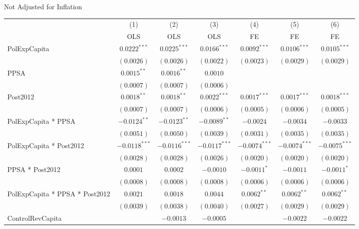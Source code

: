 \documentclass[border=10pt,varwidth=25cm]{standalone}
\renewenvironment{table}[1][]{}{}
\begin{document}
\begin{table}[H]
    \centering
    \scriptsize
    \begin{minipage}{\textwidth}
    \centering
    {\normalsize Not Adjusted for Inflation}
    \vspace{6pt}
    \begin{tabular}{lcccccc}
        \toprule
         & (1) & (2) & (3) & (4) & (5) & (6) \\
         & OLS & OLS & OLS & FE & FE & FE \\
        \midrule
        PolExpCapita & $0.0222^{***}$ & $0.0225^{***}$ & $0.0166^{***}$ & $0.0092^{***}$ & $0.0106^{***}$ & $0.0105^{***}$ \\
         & $(0.0026)$ & $(0.0026)$ & $(0.0022)$ & $(0.0023)$ & $(0.0029)$ & $(0.0029)$ \\[4pt]
        PPSA & $0.0015^{**}$ & $0.0016^{**}$ & $0.0010$ &  &  &  \\
         & $(0.0007)$ & $(0.0007)$ & $(0.0006)$ &  &  &  \\[4pt]
        Post2012 & $0.0018^{**}$ & $0.0018^{**}$ & $0.0022^{***}$ & $0.0017^{***}$ & $0.0017^{***}$ & $0.0018^{***}$ \\
         & $(0.0007)$ & $(0.0007)$ & $(0.0006)$ & $(0.0005)$ & $(0.0006)$ & $(0.0005)$ \\[4pt]
        PolExpCapita * PPSA & $-0.0124^{**}$ & $-0.0123^{**}$ & $-0.0089^{**}$ & $-0.0024$ & $-0.0034$ & $-0.0033$ \\
         & $(0.0051)$ & $(0.0050)$ & $(0.0039)$ & $(0.0031)$ & $(0.0035)$ & $(0.0035)$ \\[4pt]
        PolExpCapita * Post2012 & $-0.0118^{***}$ & $-0.0116^{***}$ & $-0.0117^{***}$ & $-0.0074^{***}$ & $-0.0074^{***}$ & $-0.0075^{***}$ \\
         & $(0.0028)$ & $(0.0028)$ & $(0.0026)$ & $(0.0020)$ & $(0.0020)$ & $(0.0020)$ \\[4pt]
        PPSA * Post2012 & $0.0001$ & $0.0002$ & $-0.0010$ & $-0.0011^{*}$ & $-0.0011$ & $-0.0011^{*}$ \\
         & $(0.0008)$ & $(0.0008)$ & $(0.0008)$ & $(0.0006)$ & $(0.0006)$ & $(0.0006)$ \\[4pt]
        PolExpCapita * PPSA * Post2012 & $0.0021$ & $0.0018$ & $0.0044$ & $0.0062^{**}$ & $0.0062^{**}$ & $0.0062^{**}$ \\
         & $(0.0039)$ & $(0.0038)$ & $(0.0040)$ & $(0.0027)$ & $(0.0029)$ & $(0.0029)$ \\[4pt]
        ControlRevCapita &  & $-0.0013$ & $-0.0005$ &  & $-0.0022$ & $-0.0022$ \\

\end{tabular}
\end{minipage}
\end{table}
\end{document}
